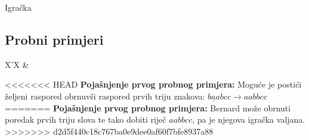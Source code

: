 \begin{statement}[
  problempoints=100,
  timelimit=1 sekunda,
  memorylimit=512 MiB,
]{Igračka}
\subsection*{Probni primjeri}
\begin{tabularx}{\textwidth}{X'X}
 &
\end{tabularx}

<<<<<<< HEAD
\textbf{Pojašnjenje prvog probnog primjera:}
Moguće je postići željeni raspored obrnuvši raspored prvih triju znakova:
$\underline{baa}bcc \rightarrow aabbcc$
=======
\textbf{Pojašnjenje prvog probnog primjera:} Bernard može obrnuti poredak
prvih triju slova te tako dobiti riječ $aabbcc$, pa je njegova igračka
valjana.
>>>>>>> d2d5f440c18c767ba0e9dee0af60f7bfe8937a88

\end{statement}

